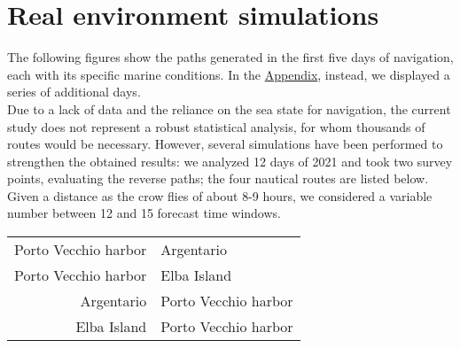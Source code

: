 \section{Real environment simulations}
The following figures show the paths generated in the first five days of navigation, each with its specific marine conditions. In the \hyperref[appendix]{Appendix}, instead, we displayed a series of additional days.\\ 
Due to a lack of data and the reliance on the sea state for navigation, the current study does not represent a robust statistical analysis, for whom thousands of routes would be necessary. However, several simulations have been performed to strengthen the obtained results: we analyzed 12 days of 2021 and took two survey points, evaluating the reverse paths; the four nautical routes are listed below.
Given a distance as the crow flies of about 8-9 hours, we considered a variable number between 12 and 15 forecast time windows. 
\vspace{0.1cm}
\begin{center}
	\begin{tabular}{@{} r @{${}\longrightarrow{}$} l @{}}
		Porto Vecchio harbor & Argentario\\
		Porto Vecchio harbor & Elba Island\\
		Argentario & Porto Vecchio harbor\\
		Elba Island & Porto Vecchio harbor
	\end{tabular}
\end{center}
\vspace{0.1cm}

